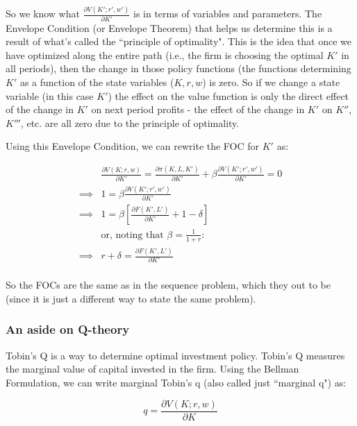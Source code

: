 \documentclass[letterpaper,12pt]{article}
\theoremstyle{definition}
\begin{document}
\begin{spacing}{1.5}
So we know what $ \frac{\partial V(K';r',w')}{\partial K'}$ is in terms of variables and parameters.  The Envelope Condition (or Envelope Theorem) that helps us determine this is a result of what's called the ``principle of optimality".  This is the idea that once we have optimized along the entire path (i.e., the firm is choosing the optimal $K'$ in all periods), then the change in those policy functions (the functions determining $K'$ as a function of the state variables ($K,r,w$) is zero.  So if we change a state variable (in this case $K'$) the effect on the value function is only the direct effect of the change in $K'$ on next period profits - the effect of the change in $K'$ on $K''$, $K'''$, etc. are all zero due to the principle of optimality.

Using this Envelope Condition, we can rewrite the FOC for $K'$ as:

\begin{equation}
\label{eqn:bellman_foc_k2}
\begin{split}
&\frac{\partial V(K;r,w)}{\partial K'} = \frac{\partial \pi(K,L,K')}{\partial K'} + \beta \frac{\partial V(K'; r',w')}{\partial K'} = 0 \\
\implies & 1 = \beta \frac{\partial V(K';r',w')}{\partial K'}  \\
\implies & 1 = \beta \left[ \frac{\partial F(K',L')}{\partial K'} + 1 - \delta \right] \\
& \text{or, noting that } \beta = \frac{1}{1+r}: \\
\implies & r+\delta = \frac{\partial F(K',L')}{\partial K'}  \\
\end{split}
\end{equation}

So the FOCs are the same as in the sequence problem, which they out to be (since it is just a different way to state the same problem).

\subsubsection*{An aside on Q-theory}

Tobin's Q is a way to determine optimal investment policy.  Tobin's Q measures the marginal value of capital invested in the firm.  Using the Bellman Formulation, we can write marginal Tobin's q (also called just ``marginal q") as:

\begin{equation}
\label{eqn:marginal_q}
q = \frac{\partial V(K;r,w)}{\partial K}
\end{equation}


\end{spacing}
\end{document}

